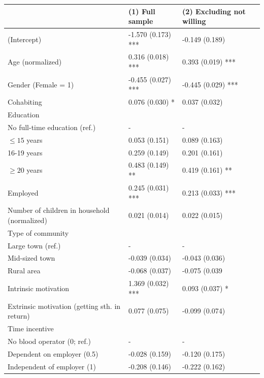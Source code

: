 \documentclass[AER]{AEA}
\begin{document}
\begin{table}[hbt!]
    \centering
    \begin{tabular}{p{8cm}|l|p{3cm}}
           & (1) Full sample & (2) Excluding not willing\\ \hline \hline
(Intercept) & -1.570 (0.173) *** & -0.149 (0.189)\\
Age (normalized) & 0.316 (0.018) *** & 0.393 (0.019) ***\\
Gender (Female = 1) & -0.455 (0.027) *** & -0.445 (0.029) ***\\
Cohabiting & 0.076 (0.030) * & 0.037 (0.032)\\
Education &  & \\
\hspace{0.7cm} No full-time education (ref.) & - & -\\
\hspace{0.7cm} $\leq 15$ years & 0.053 (0.151) & 0.089 (0.163)\\
\hspace{0.7cm} 16-19 years & 0.259 (0.149) & 0.201 (0.161)\\
\hspace{0.7cm} $\geq 20$ years & 0.483 (0.149) ** & 0.419 (0.161) **\\
Employed & 0.245 (0.031) *** & 0.213 (0.033) ***\\
Number of children in household (normalized) & 0.021 (0.014) & 0.022 (0.015)\\
Type of community &  & \\
\hspace{0.7cm} Large town (ref.) & - & -\\
\hspace{0.7cm} Mid-sized town & -0.039 (0.034) & -0.043 (0.036)\\
\hspace{0.7cm} Rural area & -0.068 (0.037) & -0.075 (0.039\\
Intrinsic motivation & 1.369 (0.032) *** & 0.093 (0.037) *\\
Extrinsic motivation (getting sth. in return) & 0.077 (0.075) & -0.099 (0.074)\\
Time incentive &  & \\
\hspace{0.7cm} No blood operator (0; ref.) & - & -\\
\hspace{0.7cm} Dependent on employer (0.5) & -0.028 (0.159) & -0.120 (0.175)\\
\hspace{0.7cm} Independent of employer (1) & -0.208 (0.146) & -0.222 (0.162)\\

\end{tabular}
\end{table}
\end{document}
